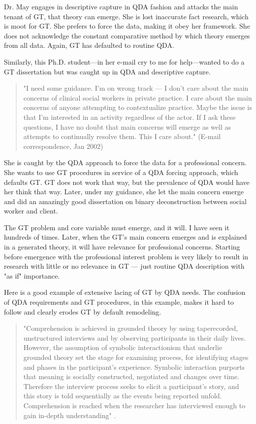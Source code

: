 Dr. May engages in descriptive capture in QDA fashion and attacks the main tenant of GT, that theory can emerge. 
She is lost inaccurate fact research, which is moot for GT.
She prefers to force the data, making it obey her framework. 
She does not acknowledge the constant comparative method by which theory emerges from all data. 
Again, GT has defaulted to routine QDA.

Similarly, this Ph.D. student—in her e-mail cry to me for help—wanted to do a
GT dissertation but was caught up in QDA and descriptive capture.

\begin{quote}
"I need some guidance. 
I’m on wrong track --- I don't care about the main concerns of clinical social workers in private practice. 
I care about the main concerns of anyone attempting to contextualize practice. 
Maybe the issue is that I'm interested in an activity regardless of the actor. 
If I ask these questions, I have no doubt that main concerns will emerge as well as attempts to continually resolve them. 
This I care about."
(E-mail correspondence, Jan 2002)
\end{quote}

She is caught by the QDA approach to force the data for a professional concern.
She wants to use GT procedures in service of a QDA forcing approach, which defaults GT. 
GT does not work that way, but the prevalence of QDA would have her think that way. 
Later, under my guidance, she let the main concern emerge and did an amazingly good dissertation on binary deconstruction between social worker and client.

The GT problem and core variable must emerge, and it will.
I have seen it hundreds of times. 
Later, when the GT's main concern emerges and is explained in a generated theory, it will have relevance for professional concerns.
Starting before emergence with the professional interest problem is very likely to result in research with little or no relevance in GT --- just routine QDA description with "as if" importance.

Here is a good example of extensive lacing of GT by QDA needs. 
The confusion of QDA requirements and GT procedures, in this example, 
makes it hard to follow and clearly erodes GT by default remodeling.

\begin{quote}
"Comprehension is achieved in grounded theory by using taperecorded,
unstructured interviews and by observing participants in their
daily lives.
However, the assumption of symbolic interactionism that
underlie grounded theory set the stage for examining process, for
identifying stages and phases in the participant’s experience.
Symbolic interaction purports that meaning is socially constructed, negotiated
and changes over time.
Therefore the interview process seeks to elicit a participant’s story,
and this story is told sequentially as the events being reported unfold.
Comprehension is reached when the researcher has
interviewed enough to gain in-depth understanding"
\citep[p. 39]{incollection.morse86}.
\end{quote}

